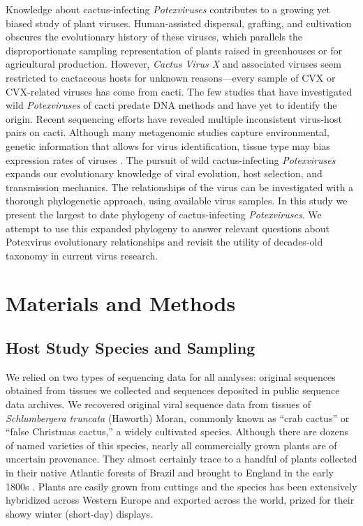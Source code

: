 \documentclass[fleqn,10pt,lineno]{wlpeerj}
\begin{document}
Knowledge about cactus-infecting \textit{Potexviruses} contributes to a growing yet biased study of plant viruses. 
Human-assisted dispersal, grafting, and cultivation obscures the evolutionary history of these viruses, which parallels the disproportionate sampling representation of plants raised in greenhouses or for agricultural production. 
However, \textit{Cactus Virus X} and associated viruses seem restricted to cactaceous hosts for unknown reasons---every sample of CVX or CVX-related viruses has come from cacti.
The few studies that have investigated wild \textit{Potexviruses} of cacti predate DNA methods and have yet to identify the origin.
Recent sequencing efforts have revealed multiple inconsistent virus-host pairs on cacti.
Although many metagenomic studies capture environmental, genetic information that allows for virus identification, tissue type may bias expression rates of viruses \citep{lacroix2016methodological}.
The pursuit of wild cactus-infecting \textit{Potexviruses} expands our evolutionary knowledge of viral evolution, host selection, and transmission mechanics. 
The relationships of the virus can be investigated with a thorough phylogenetic approach, using available virus samples. 
In this study we present the largest to date phylogeny of cactus-infecting \textit{Potexviruses}.
We attempt to use this expanded phylogeny to answer relevant questions about Potexvirus evolutionary relationships and revisit the utility of decades-old taxonomy in current virus research. 


\section*{Materials and Methods}

\subsection*{Host Study Species and Sampling}

We relied on two types of sequencing data for all analyses: original sequences obtained from tissues we collected and sequences deposited in public sequence data archives. 
We recovered original viral sequence data from tissues of \textit{Schlumbergera truncata} (Haworth) Moran, commonly known as ``crab cactus'' or ``false Christmas cactus,'' a widely cultivated species.
Although there are dozens of named varieties of this species, nearly all commercially grown plants are of uncertain provenance. 
They almost certainly trace to a handful of plants collected in their native Atlantic forests of Brazil and brought to England in the early 1800s \citep{boyle2003}. 
Plants are easily grown from cuttings and the species has been extensively hybridized across Western Europe and exported across the world, prized for their showy winter (short-day) displays.
\end{document}
